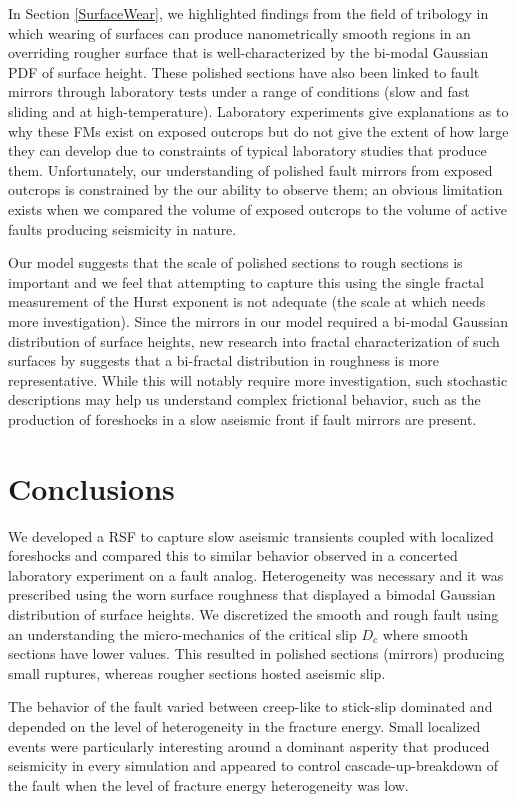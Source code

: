 \documentclass[preprint,1p, 10pt,authoryear]{elsarticle}
\begin{document}
In Section \ref{SurfaceWear}, we highlighted findings from the field of tribology in which wearing of surfaces can produce nanometrically smooth regions in an overriding rougher surface that is well-characterized by the bi-modal Gaussian PDF of surface height. These polished sections have also been linked to fault mirrors through laboratory tests under a range of conditions (slow and fast sliding and at high-temperature).  Laboratory experiments give explanations as to why these FMs exist on exposed outcrops but do not give the extent of how large they can develop due to constraints of typical laboratory studies that produce them. Unfortunately, our understanding of polished fault mirrors from exposed outcrops is constrained by the our ability to observe them; an obvious limitation exists when we compared the volume of exposed outcrops to the volume of active faults producing seismicity in nature.  

Our model suggests that the scale of polished sections to rough sections is important and we feel that attempting to capture this using the single fractal measurement of the Hurst exponent is not adequate (the scale at which needs more investigation). Since the mirrors in our model required a bi-modal Gaussian distribution of surface heights, new research into fractal characterization of such surfaces by \citet{Hu2019} suggests that a bi-fractal distribution in roughness is more representative. While this will notably require more investigation, such stochastic descriptions may help us understand complex frictional behavior, such as the production of foreshocks in a slow aseismic front if fault mirrors are present.

\section{Conclusions}
We developed a RSF to capture slow aseismic transients coupled with localized foreshocks and compared this to similar behavior observed in a concerted laboratory experiment on a fault analog. Heterogeneity was necessary and it was prescribed using the worn surface roughness that displayed a bimodal Gaussian distribution of surface heights. We discretized the smooth and rough fault using an understanding the micro-mechanics of the critical slip $D_{c}$ where smooth sections have lower values. This resulted in polished sections (mirrors) producing small ruptures, whereas rougher sections hosted aseismic slip.  

The behavior of the fault varied between creep-like to stick-slip dominated and depended on the level of heterogeneity in the fracture energy. Small localized events were particularly interesting around a dominant asperity that produced seismicity in every simulation and appeared to control cascade-up-breakdown of the fault when the level of fracture energy heterogeneity was low. 
\end{document}

